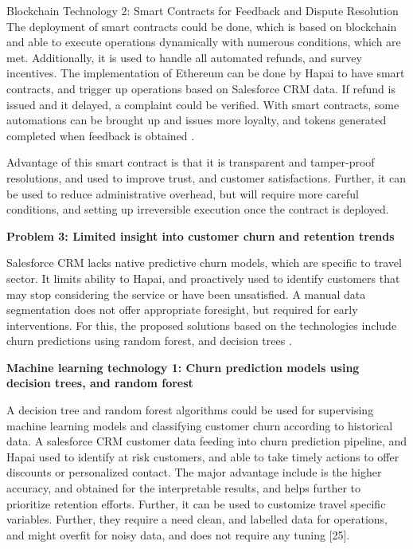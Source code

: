 \documentclass{article}
\begin{document}
Blockchain Technology 2: Smart Contracts for Feedback and Dispute Resolution
The deployment of smart contracts could be done, which is based on blockchain and able to execute operations dynamically with numerous conditions, which are met. Additionally, it is used to handle all automated refunds, and survey incentives. The implementation of Ethereum can be done by Hapai to have smart contracts, and trigger up operations based on Salesforce CRM data. If refund is issued and it delayed, a complaint could be verified. With smart contracts, some automations can be brought up and issues more loyalty, and tokens generated completed when feedback is obtained \cite{taherdoost_smart_2023}. 

Advantage of this smart contract is that it is transparent and tamper-proof resolutions, and used to improve trust, and customer satisfactions. Further, it can be used to reduce administrative overhead, but will require more careful conditions, and setting up irreversible execution once the contract is deployed. 

\textbf{Problem 3: Limited insight into customer churn and retention trends} 

Salesforce CRM lacks native predictive churn models, which are specific to travel sector. It limits ability to Hapai, and proactively used to identify customers that may stop considering the service or have been unsatisfied. A manual data segmentation does not offer appropriate foresight, but required for early interventions. For this, the proposed solutions based on the technologies include churn predictions using random forest, and decision trees \cite{boozary_enhancing_2025}. 

\textbf{Machine learning technology 1: Churn prediction models using decision trees, and random forest}

A decision tree and random forest algorithms could be used for supervising machine learning models and classifying customer churn according to historical data. A salesforce CRM customer data feeding into churn prediction pipeline, and Hapai used to identify at risk customers, and able to take timely actions to offer discounts or personalized contact. The major advantage include is the higher accuracy, and obtained for the interpretable results, and helps further to prioritize retention efforts. Further, it can be used to customize travel specific variables. Further, they require a need clean, and labelled data for operations, and might overfit for noisy data, and does not require any tuning [25]. 
\end{document}
